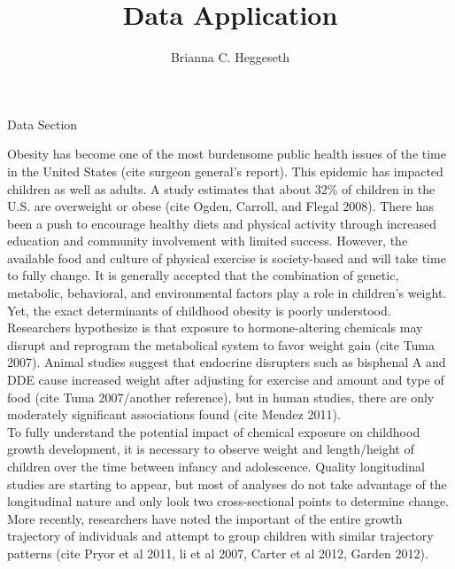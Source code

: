 \documentclass[11pt]{article}
\title{Data Application}
\author{Brianna C. Heggeseth}
\begin{document}
\doublespace
\maketitle

Data Section 

Obesity has become one of the most burdensome public health issues of the time in the United States (cite surgeon general's report).  This epidemic has impacted children as well as adults.  A study estimates that about 32\% of children in the U.S. are overweight or obese (cite Ogden, Carroll, and Flegal 2008). There has been a push to encourage healthy diets and physical activity through increased education and community involvement with limited success. However, the available food and culture of physical exercise is society-based and will take time to fully change. It is generally accepted that the combination of genetic, metabolic, behavioral, and environmental factors play a role in children's weight. Yet, the exact determinants of childhood obesity is poorly understood.\\

Researchers hypothesize is that exposure to hormone-altering chemicals may disrupt and reprogram the metabolical system to favor weight gain (cite Tuma 2007). Animal studies suggest that endocrine disrupters such as bisphenal A and DDE cause increased weight after adjusting for exercise and amount and type of food (cite Tuma 2007/another reference), but in human studies, there are only moderately significant associations found (cite Mendez 2011).\\
 
 To fully understand the potential impact of chemical exposure on childhood growth development, it is necessary to observe weight and length/height of children over the time between infancy and adolescence. Quality longitudinal studies are starting to appear, but most of analyses do not take advantage of the longitudinal nature and only look two cross-sectional points to determine change. More recently, researchers have noted the important of the entire growth trajectory of individuals and attempt to group children with similar trajectory patterns (cite Pryor et al 2011, li et al 2007, Carter et al 2012, Garden 2012). \\
\end{document}

